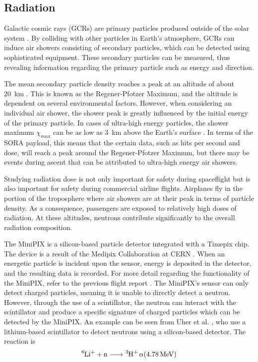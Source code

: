 \subsection{Radiation}
\label{sec: Radiation Background}

Galactic cosmic rays (GCRs) are primary particles produced outside of the solar system \cite{GCRs}.
By colliding with other particles in Earth's atmosphere, GCRs can induce air showers consisting of secondary particles, which can be detected using sophisticated equipment.
These secondary particles can be measured, thus revealing information regarding the primary particle such as energy and direction. 

The mean secondary particle density reaches a peak at an altitude of about \SI{20}{\kilo\meter} \cite{regener}.
This is known as the Regener-Pfotzer Maximum, and the altitude is dependent on several environmental factors.
However, when considering an individual air shower, the shower peak is greatly influenced by the initial energy of the primary particle.
In cases of ultra-high energy particles, the shower maximum $\chi _{max}$ can be as low as \SI{3}{\kilo\meter} above the Earth's surface \cite{Frank}.
In terms of the SORA payload, this means that the certain data, such as hits per second and dose, will reach a peak around the Regener-Pfotzer Maximum, but there may be events during ascent that can be attributed to ultra-high energy air showers.

Studying radiation dose is not only important for safety during spaceflight but is also important for safety during commercial airline flights.
Airplanes fly in the portion of the troposphere where air showers are at their peak in terms of particle density. As a consequence, passengers are exposed to relatively high doses of radiation.
At these altitudes, neutrons contribute significantly to the overall radiation composition.

The MiniPIX \cite{silicon_sensor} is a silicon-based particle detector integrated with a Timepix \cite{timepix} chip. The device is a result of the Medipix Collaboration at CERN \cite{medipix}. 
When an energetic particle is incident upon the sensor, energy is deposited in the detector, and the resulting data is recorded.
For more detail regarding the functionality of the MiniPIX, refer to the previous flight report \cite{SORA}.
The MiniPIX's sensor can only detect charged particles, meaning it is unable to directly detect a neutron. However, through the use of a scintillator, the neutron can interact with the scintillator and produce a specific signature of charged particles which can be detected by the MiniPIX.
An example can be seen from Uher et al. \cite{Uher}, who use a lithium-based scintillator to detect neutrons using a silicon-based detector. The reaction is \[\ce{^6Li^+ + n -> ^3H+ \alpha (\SI{4.78}{\mega\eV})}\]

